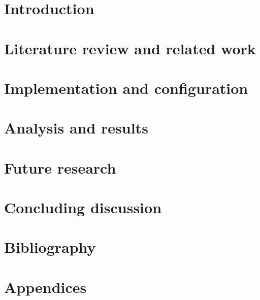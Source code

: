 \documentclass{article}
\newcommand\importsection[2]{
 \section{#1}
 
}
\begin{document}





\importsection{Introduction}{./sections/introduction.tex} %
\importsection{Literature review and related work}{./sections/literature.tex} %
\importsection{Implementation and configuration}{./sections/impl_and_conf.tex} %
\importsection{Analysis and results}{./sections/analysis_and_rslt.tex} %
\importsection{Future research}{./sections/future_research.tex} %
\importsection{Concluding discussion}{./sections/concluding_disc.tex} %
\importsection{Bibliography}{./sections/bibliography.tex} %
\importsection{Appendices}{./sections/appendices.tex} %
\end{document}

